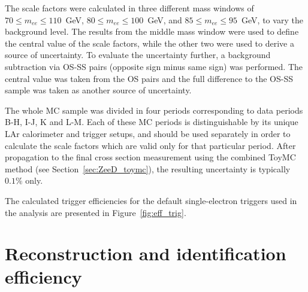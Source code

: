 The scale factors were calculated in three different mass windows of $70 \le m_{ee} \le 110$~GeV, $80 \le m_{ee} \le 100$~GeV, and $85 \le m_{ee} \le 95$~GeV, to vary the background level. The results from the middle mass window were used to define the central value of the scale factors, while the other two were used to derive a source of uncertainty. To evaluate the uncertainty further, a background subtraction via OS-SS pairs (opposite sign minus same sign) was performed. The central value was taken from the OS pairs and the full difference to the OS-SS sample was taken as another source of uncertainty.

The whole MC sample was divided in four periods corresponding to data periods B-H, I-J, K and L-M. Each of these MC periods is distinguishable by its unique LAr calorimeter and trigger setups, and should be used separately in order to calculate the scale factors which are valid only for that particular period. After propagation to the final cross section measurement using the combined ToyMC method (see Section~\ref{sec:ZeeD_toymc}), the resulting uncertainty is typically $0.1\%$ only.

The calculated trigger efficiencies for the default single-electron triggers used in the analysis are presented in Figure~\ref{fig:eff_trig}.

\begin{figure}
\end{figure}

\section{Reconstruction and identification efficiency}

